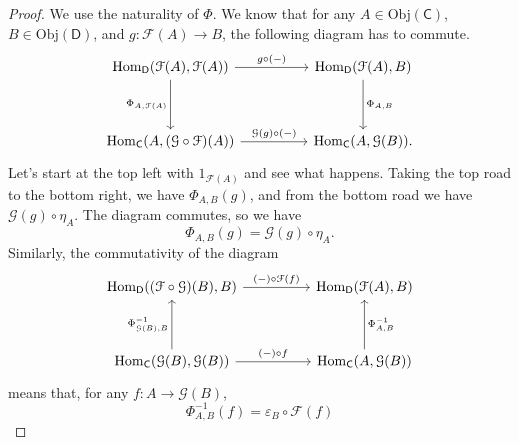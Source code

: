\documentclass[a4paper]{report}
\newcommand{\Obj}{\mathrm{Obj}}
\newcommand{\Hom}{\mathrm{Hom}}
\theoremstyle{definition}
\theoremstyle{plain}
\theoremstyle{remark}
\begin{document}
\begin{proof}
  We use the naturality of $\Phi$. We know that for any $A \in \Obj(\mathsf{C})$, $B \in \Obj(\mathsf{D})$, and $g\colon \mathcal{F}(A) \to B$, the following diagram has to commute.
  \begin{equation*}
    \begin{tikzcd}[row sep=huge, column sep=huge]
      \Hom_{\mathsf{D}}(\mathcal{F}(A), \mathcal{F}(A))
      \arrow[r, "g \circ (-)"]
      \arrow[d, swap, "\Phi_{A, \mathcal{F}(A)}"]
      & \Hom_{\mathsf{D}}(\mathcal{F}(A), B)
      \arrow[d, "\Phi_{A, B}"]
      \\
      \Hom_{\mathsf{C}}(A, (\mathcal{G} \circ \mathcal{F})(A))
      \arrow[r, "\mathcal{G}(g) \circ (-)"]
      & \Hom_{\mathsf{C}}(A, \mathcal{G}(B)).
    \end{tikzcd}
  \end{equation*}
  Let's start at the top left with $1_{\mathcal{F}(A)}$ and see what happens. Taking the top road to the bottom right, we have $\Phi_{A, B}(g)$, and from the bottom road we have $\mathcal{G}(g) \circ \eta_{A}$. The diagram commutes, so we have
  \begin{equation*}
    \Phi_{A, B}(g) = \mathcal{G}(g) \circ \eta_{A}.
  \end{equation*}
  Similarly, the commutativity of the diagram
  \begin{equation*}
    \begin{tikzcd}[row sep=huge, column sep=huge]
      \Hom_{\mathsf{D}}((\mathcal{F} \circ \mathcal{G})(B), B)
      \arrow[r, "(-) \circ \mathcal{F}(f)"]
      & \Hom_{\mathsf{D}}(\mathcal{F}(A), B)
      \\
      \Hom_{\mathsf{C}}(\mathcal{G}(B), \mathcal{G}(B))
      \arrow[r, "(-) \circ f"]
      \arrow[u, "{\Phi^{-1}_{\mathcal{G}(B), B}}"]
      & \Hom_{\mathsf{C}}(A, \mathcal{G}(B))
      \arrow[u, swap, "\Phi^{-1}_{A, B}"]
    \end{tikzcd}
  \end{equation*}
  means that, for any $f\colon A \to \mathcal{G}(B)$,
  \begin{equation*}
    \Phi^{-1}_{A, B}(f) = \varepsilon_{B} \circ \mathcal{F}(f) 
  \end{equation*}


\end{proof}
\end{document}
